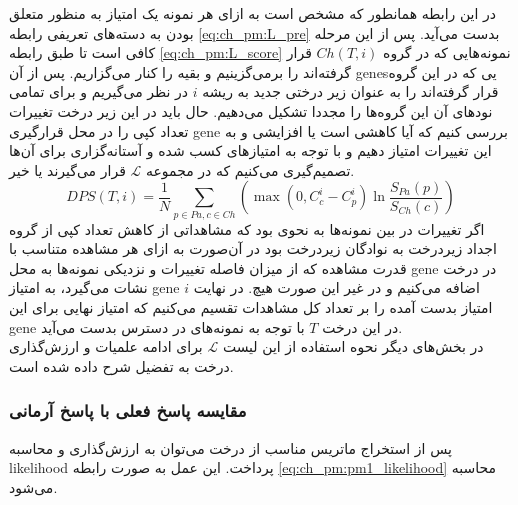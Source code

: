 در این رابطه همانطور که مشخص است به ازای هر نمونه یک امتیاز به منظور متعلق بودن به دسته‌های تعریفی رابطه \ref{eq:ch_pm:L_pre} بدست می‌آید. پس از این مرحله کافی است تا طبق رابطه \ref{eq:ch_pm:L_score} نمونه‌هایی که در گروه $Ch(T, i)$ قرار گرفته‌اند را برمی‌گزینیم و بقیه را کنار می‌گزاریم. پس از آن \glspl{gene}یی که در این گروه قرار گرفته‌اند را به عنوان زیر درختی جدید به ریشه $i$ در نظر می‌گیریم و برای تمامی نودهای آن این گروه‌ها را مجددا تشکیل می‌دهیم. حال باید در این زیر درخت تغییرات تعداد کپی را در محل قرارگیری \gls{gene} بررسی کنیم که آیا کاهشی است یا افزایشی و به این تغییرات امتیاز دهیم و با توجه به امتیازهای کسب شده و آستانه‌گزاری برای آن‌ها تصمیم‌گیری می‌کنیم که در مجموعه $\mathcal{L}$ قرار می‌گیرند یا خیر.
\begin{equation}
	DPS(T, i) = \frac{1}{N}\sum_{p\in Pa, c\in Ch} \left( \max\left( {0, C_c^i-C_p^i}\right)  \ln\frac{S_{Pa}(p)}{S_{Ch}(c)} \right)
	\label{eq:ch_pm:L_score}
\end{equation}
اگر تغییرات در بین نمونه‌ها به نحوی بود که مشاهداتی از کاهش تعداد کپی از گروه اجداد زیردرخت به نوادگان زیردرخت بود در آن‌صورت به ازای هر مشاهده متناسب با قدرت مشاهده که از میزان فاصله تغییرات و نزدیکی نمونه‌ها به محل \gls{gene} در درخت نشات می‌گیرد، به امتیاز \gls{gene} $i$ اضافه می‌کنیم و در غیر این صورت هیچ. در نهایت امتیاز بدست آمده را بر تعداد کل مشاهدات تقسیم می‌کنیم که امتیاز نهایی برای این \gls{gene} در این درخت $T$ با توجه به نمونه‌های در دسترس بدست می‌آید.
\\
در بخش‌های دیگر نحوه استفاده از این لیست $\mathcal{L}$ برای ادامه علمیات و ارزش‌گذاری درخت به تفضیل شرح داده شده است.


\subsubsection{مقایسه پاسخ فعلی با پاسخ آرمانی}
پس از استخراج ماتریس مناسب از درخت می‌توان به ارزش‌گذاری و محاسبه \gls{likelihood} پرداخت. این عمل به صورت رابطه \ref{eq:ch_pm:pm1_likelihood} محاسبه می‌شود. 

